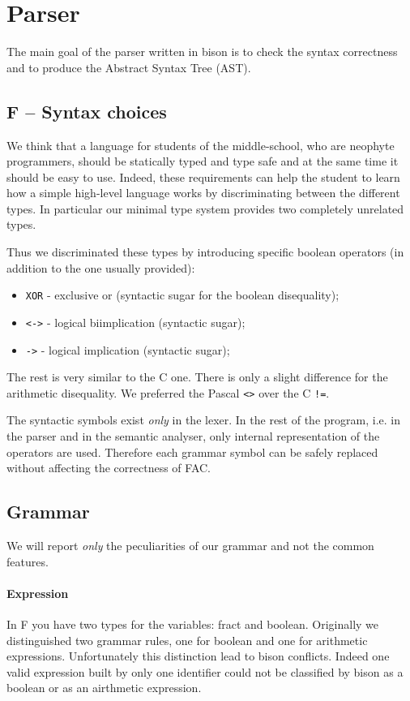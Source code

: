 \section{Parser}
\label{sec:parser}
The main goal of the parser written in bison is to check the
syntax correctness and to produce the Abstract Syntax Tree (AST).

\subsection{F -- Syntax choices}
We think that a language for students of the middle-school,
who are neophyte programmers, should be statically typed and type safe and
at the same time it should be easy to use. 
Indeed, these requirements can help the student to learn how a simple 
high-level language works by discriminating between the different types.
In particular our minimal type system provides two completely unrelated types.


Thus we discriminated these types by introducing specific boolean
operators (in addition to the one usually provided):
\begin{itemize}
	\item \verb|XOR| - exclusive or (syntactic sugar for the boolean disequality);
	\item \verb|<->| - logical biimplication (syntactic sugar);
	\item \verb|->| - logical implication (syntactic sugar);
\end{itemize}

The rest is very similar to the C one. There is only a slight difference
for the arithmetic disequality. We preferred the Pascal \verb|<>| over 
the C \verb|!=|.

The syntactic symbols exist \emph{only} in the lexer. In the
rest of the program, i.e. in the parser and in the semantic analyser, only
internal representation of the operators are used. Therefore each grammar
symbol can be safely replaced without affecting the correctness of FAC.

\subsection{Grammar}
We will report \emph{only} the peculiarities of our grammar and not the common 
features.

\paragraph{Expression}
In F you have two types for the variables: fract and boolean.
Originally we distinguished two grammar rules, one for boolean and 
one for arithmetic expressions. Unfortunately this distinction
lead to bison conflicts. 
Indeed one valid expression built by only one identifier could not be 
classified by bison as a boolean or as an airthmetic expression.


